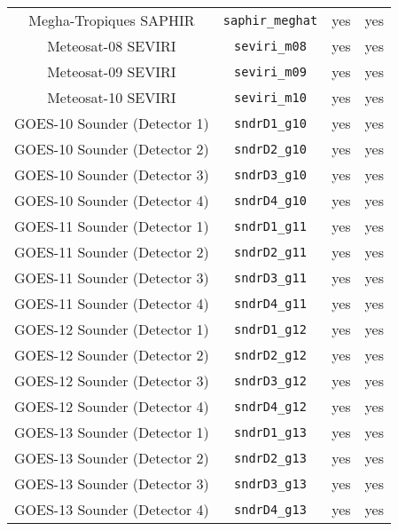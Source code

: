 \begin{center}
\begin{longtable}{c c c c}
  Megha-Tropiques SAPHIR             & \texttt{saphir\_meghat}      &  yes     &  yes       \\
  Meteosat-08 SEVIRI                 & \texttt{seviri\_m08}         &  yes     &  yes       \\
  Meteosat-09 SEVIRI                 & \texttt{seviri\_m09}         &  yes     &  yes       \\
  Meteosat-10 SEVIRI                 & \texttt{seviri\_m10}         &  yes     &  yes       \\
  GOES-10 Sounder (Detector 1)       & \texttt{sndrD1\_g10}         &  yes     &  yes       \\
  GOES-10 Sounder (Detector 2)       & \texttt{sndrD2\_g10}         &  yes     &  yes       \\
  GOES-10 Sounder (Detector 3)       & \texttt{sndrD3\_g10}         &  yes     &  yes       \\
  GOES-10 Sounder (Detector 4)       & \texttt{sndrD4\_g10}         &  yes     &  yes       \\
  GOES-11 Sounder (Detector 1)       & \texttt{sndrD1\_g11}         &  yes     &  yes       \\
  GOES-11 Sounder (Detector 2)       & \texttt{sndrD2\_g11}         &  yes     &  yes       \\
  GOES-11 Sounder (Detector 3)       & \texttt{sndrD3\_g11}         &  yes     &  yes       \\
  GOES-11 Sounder (Detector 4)       & \texttt{sndrD4\_g11}         &  yes     &  yes       \\
  GOES-12 Sounder (Detector 1)       & \texttt{sndrD1\_g12}         &  yes     &  yes       \\
  GOES-12 Sounder (Detector 2)       & \texttt{sndrD2\_g12}         &  yes     &  yes       \\
  GOES-12 Sounder (Detector 3)       & \texttt{sndrD3\_g12}         &  yes     &  yes       \\
  GOES-12 Sounder (Detector 4)       & \texttt{sndrD4\_g12}         &  yes     &  yes       \\
  GOES-13 Sounder (Detector 1)       & \texttt{sndrD1\_g13}         &  yes     &  yes       \\
  GOES-13 Sounder (Detector 2)       & \texttt{sndrD2\_g13}         &  yes     &  yes       \\
  GOES-13 Sounder (Detector 3)       & \texttt{sndrD3\_g13}         &  yes     &  yes       \\
  GOES-13 Sounder (Detector 4)       & \texttt{sndrD4\_g13}         &  yes     &  yes       \\

\end{longtable}
\end{center}
